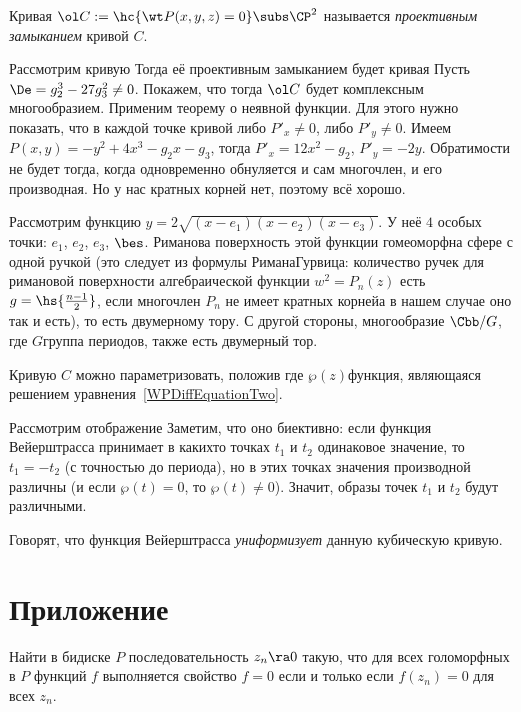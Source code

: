\documentclass[a4paper]{article}
\begin{document}
\begin{df}
Кривая $\ol C := \hc{\wt P(x,y,z) =0}\subs \CP^2$ называется \emph{проективным
замыканием} кривой $C$.
\end{df}

Рассмотрим кривую
Тогда её проективным замыканием будет кривая
Пусть $\De = g_2^3-27g_3^2 \neq 0$.  Покажем, что тогда $\ol C$ будет
комплексным многообразием.
Применим теорему о неявной функции. Для этого нужно показать,
что в каждой точке кривой либо $P'_x\neq 0$, либо $P'_y\neq 0$.
Имеем $P(x,y) = -y^2 + 4x^3-g_2x-g_3$, тогда $P'_x = 12x^2-g_2$, $P'_y = -2y$.
Обратимости не будет тогда, когда одновременно обнуляется и сам многочлен,
и его производная. Но у нас кратных корней нет, поэтому всё хорошо.

Рассмотрим функцию $y  = 2\sqrt{(x-e_1)(x-e_2)(x-e_3)}$. У неё $4$ особых
точки: $e_1$, $e_2$, $e_3$, $\bes$. Риманова поверхность этой функции гомеоморфна
сфере с одной ручкой (это следует из формулы Римана\ч Гурвица: количество ручек
для римановой поверхности алгебраической функции $w^2 = P_n(z)$ есть $g = \hs{\frac{n-1}{2}}$, если
многочлен $P_n$ не имеет кратных корней\т а в нашем случае оно так и есть), то есть двумерному тору.
С другой стороны, многообразие $\Cbb/G$, где $G$\т группа периодов, также есть двумерный тор.

Кривую $C$ можно параметризовать, положив
где $\wp(z)$\т функция, являющаяся решением уравнения~\eqref{WPDiffEquationTwo}.

Рассмотрим отображение
Заметим, что оно биективно: если функция Вейерштрасса принимает в каких\д то
точках $t_1$ и $t_2$ одинаковое значение, то $t_1 = -t_2$ (с точностью до периода),
но в этих точках значения производной различны (и если $\wp (t)=0$, то $\wp (t)\neq 0$).
Значит, образы точек $t_1$ и $t_2$ будут различными.

Говорят, что функция Вейерштрасса \emph{униформизует} данную кубическую кривую.


\section{Приложение}

\begin{problem}
Найти в бидиске $P$ последовательность $z_n\ra 0$ такую, что для всех голоморфных
в $P$ функций $f$ выполняется свойство $f = 0$ если и только если $f(z_n) = 0$ для всех $z_n$.
\end{problem}
\end{document}
